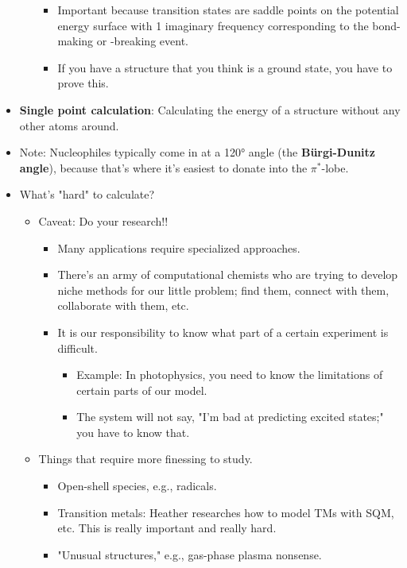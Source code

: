 \documentclass[../notes.tex]{subfiles}
\begin{document}
\begin{itemize}
\begin{itemize}
        \begin{itemize}
            \item Important because transition states are saddle points on the potential energy surface with 1 imaginary frequency corresponding to the bond-making or -breaking event.
            \item If you have a structure that you think is a ground state, you have to prove this.
        \end{itemize}
    \end{itemize}
    \item \textbf{Single point calculation}: Calculating the energy of a structure without any other atoms around.
    \item Note: Nucleophiles typically come in at a \ang{120} angle (the \textbf{B\"{u}rgi-Dunitz angle}), because that's where it's easiest to donate into the $\pi^*$-lobe.
    \item What's "hard" to calculate?
    \begin{itemize}
        \item Caveat: Do your research!!
        \begin{itemize}
            \item Many applications require specialized approaches.
            \item There's an army of computational chemists who are trying to develop niche methods for our little problem; find them, connect with them, collaborate with them, etc.
            \item It is our responsibility to know what part of a certain experiment is difficult.
            \begin{itemize}
                \item Example: In photophysics, you need to know the limitations of certain parts of our model.
                \item The system will not say, "I'm bad at predicting excited states;" you have to know that.
            \end{itemize}
        \end{itemize}
        \item Things that require more finessing to study.
        \begin{itemize}
            \item Open-shell species, e.g., radicals.
            \item Transition metals: Heather researches how to model TMs with SQM, etc. This is really important and really hard.
            \item "Unusual structures," e.g., gas-phase plasma nonsense.

\end{itemize}
\end{itemize}
\end{itemize}
\end{document}
